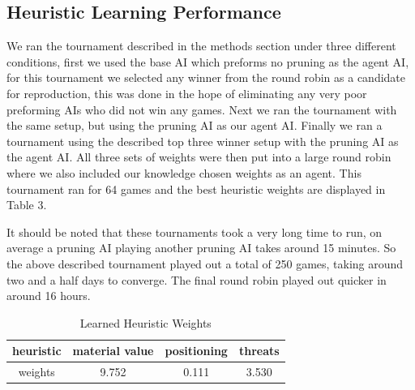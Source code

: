 \documentclass[letterpaper]{article}
\begin{document}
\subsection{Heuristic Learning Performance}
We ran the tournament described in the methods section under three different conditions, first we used the base AI which preforms no pruning as the agent AI, for this tournament we selected any winner from the round robin as a candidate for reproduction, this was done in the hope of eliminating any very poor preforming AIs who did not win any games. Next we ran the tournament with the same setup, but using the pruning AI as our agent AI. Finally we ran a tournament using the described top three winner setup with the pruning AI as the agent AI. All three sets of weights were then put into a large round robin where we also included our knowledge chosen weights as an agent. This tournament ran for 64 games and the best heuristic weights are displayed in Table 3. 

It should be noted that these tournaments took a very long time to run, on average a pruning AI playing another pruning AI takes around 15 minutes. So the above described tournament played out a total of 250 games, taking around two and a half days to converge. The final round robin played out quicker in around 16 hours.

\begin{table}[t]
    \centering
    \begin{tabular}{|c|c|c|c|} \hline
        heuristic &  material value & positioning & threats\\\hline
        weights & 9.752 &  0.111 & 3.530\\\hline
    \end{tabular}
    \caption{Learned Heuristic Weights}
    \label{tab:my_label}
\end{table}
\end{document}
